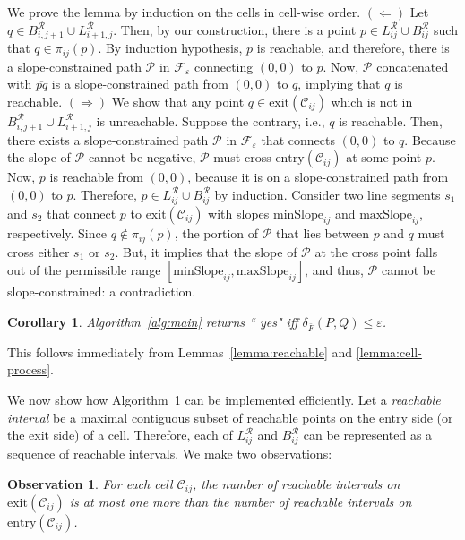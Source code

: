 \documentclass[12pt]{dalthesis}
\def\favoritefont{\bfseries \sffamily}
\def\QED{\ensuremath{{\Box}}}
\def\markatright#1{\leavevmode\unskip\nobreak\quad\hspace*{\fill}{#1}}
\newenvironment{proof}
	{\begin{trivlist}\item[\hskip\labelsep{\favoritefont Proof:}]}
	{\markatright{\QED}\end{trivlist}}
\newtheorem{corollary}[theorem]{Corollary}
\newtheorem{obs}{Observation}
\newcommand{\lee}{\leqslant}
\newcommand{\eps}{\varepsilon}
\newcommand{\CF}{{\mathscr F}}
\newcommand{\CR}{{\mathscr R}}
\newcommand{\CP}{{\mathscr P}}
\newcommand{\CC}{{\mathscr C}}
\newcommand{\distFS}{\delta_{\bar{F}}} \newcommand{\distWeakF}{\delta_{\bar{N}}} \newcommand{\distClosedF}{\delta_{\bar{C}}} \newcommand{\distPartialF}{\delta_{\bar{P}}} \newcommand{\distGrpahF}{\delta_{\bar{G}}} \newcommand{\distDisF}{\delta_{dF}} \newcommand{\distGeoF}{\delta_{\hat{F}}} \newcommand{\distHomF}{\delta_{h}} \newcommand{\distC}{\delta_C} \newcommand{\distSetF}{\delta_{\CF}}
\newcommand{\SC}{slope-constrained }
\newcommand{\cell}[1]{{\CC_{#1}}}
\newcommand{\Feps}{\CF_\eps}
\newcommand{\LR}{L^\CR}
\newcommand{\BR}{B^\CR}
\newcommand{\minS}[1]{\mbox{minSlope}_{#1}}
\newcommand{\maxS}[1]{\mbox{maxSlope}_{#1}}
\newcommand{\entry}[1]{\mbox{entry}(\cell{#1})}
\newcommand{\exit}[1]{\mbox{exit}(\cell{#1})}
\newcommand{\proj}[1]{\pi_{#1}}
\begin{document}
\begin{proof}
	We prove the lemma by induction on the cells in cell-wise order.
	$(\Leftarrow)$ 
	Let $q \in \BR_{i,j+1} \cup  \LR_{i+1,j}$.
	Then, by our construction, there is a point $p \in \LR_{ij} \cup \BR_{ij}$
	such that $q \in \proj{ij}(p)$.
	By induction hypothesis, $p$ is reachable, and therefore,
	there is a \SC path $\CP$ in $\Feps$ connecting $(0,0)$ to $p$.
	Now, $\CP$ concatenated with $\overline{pq}$ is a slope-constrained path from $(0,0)$ to $q$, 
	implying that $q$ is reachable.
	$(\Rightarrow)$ 
	We show that any point $q \in \exit{ij}$ which is not in $\BR_{i,j+1} \cup  \LR_{i+1,j}$ is unreachable.
	Suppose the contrary, i.e., $q$ is reachable.
	Then, there exists a \SC path $\CP$ in $\Feps$ that connects $(0,0)$ to $q$.
	Because the slope of $\CP$ cannot be negative, $\CP$ must
	cross $\entry{ij}$ at some point $p$.
	Now, $p$ is reachable from $(0,0)$, because it is on a \SC path from $(0,0)$ to $p$.
	Therefore, $p \in \LR_{ij} \cup \BR_{ij}$ by induction.
	Consider two line segments $s_1$ and $s_2$ that connect $p$ to $\exit{ij}$
	with slopes $\minS{ij}$ and $\maxS{ij}$, respectively.
	Since $q \not\in \proj{ij}(p)$,
	the portion of $\CP$ that lies between $p$ and $q$ must cross either $s_1$ or $s_2$.
	But, it implies that the slope of $\CP$ at the cross point falls out of the permissible range $[\minS{ij}, \maxS{ij}]$,
	and thus, $\CP$ cannot be slope-constrained: a contradiction.
\end{proof}

\begin{corollary} \label{cor:correctness}
	Algorithm~\ref{alg:main} returns 
`` {\sc yes}" iff $\distFS(P,Q) \lee \eps$.
\end{corollary}
\begin{proof}
	This follows immediately from Lemmas~\ref{lemma:reachable} and \ref{lemma:cell-process}.
\end{proof}

We now show how Algorithm~1 can be implemented efficiently.
Let a {\em reachable interval\/} be a maximal contiguous subset of reachable points on 
the entry side (or the exit side) of a cell.
Therefore, each of $\LR_{ij}$ and $\BR_{ij}$ can be represented as a sequence of reachable intervals.
We make two observations:

\begin{obs} \label{obs:newInterval}
	For each cell $\cell{ij}$, the number of reachable intervals on $\exit{ij}$ is at most one more than
	the number of reachable intervals on $\entry{ij}$.
\end{obs}
\end{document}
